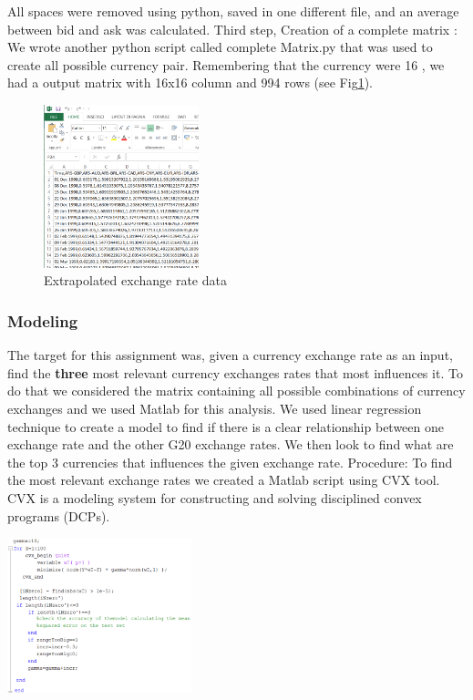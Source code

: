 All spaces were removed using python,  saved in one different file, and an average between bid and ask was calculated.
\newline
Third step, Creation of a complete matrix : We wrote another python script called complete Matrix.py that was used to create all possible currency pair. Remembering that the currency were 16 , we had a output matrix with 16x16 column and 994 rows (see Fig\ref{extrap_ex_data}).

\begin{figure}[!h]
	\begin{center}
		\includegraphics[width=0.4\textwidth]{bbb.png}
		\caption{Extrapolated exchange rate data}
		\label{extrap_ex_data}
	\end{center}
\end{figure}

\subsubsection{Modeling}
The target for this assignment was, given a currency exchange rate as an input, find the \textbf{three} most relevant currency exchanges rates that most influences it. To do that we considered the matrix containing all possible combinations of currency exchanges and we used Matlab for this analysis. We used linear regression technique to create a model to find if there is a clear relationship between one exchange rate and the other G20 exchange rates. We then look to find what are the top 3 currencies that influences the given exchange rate.
\newline
Procedure:
To find the most relevant exchange rates we created a Matlab script using CVX tool. CVX is a modeling system for constructing and solving disciplined convex programs (DCPs)\cite{leung2000forecasting}. 

\includegraphics[width=0.4\textwidth]{ccc.png}

